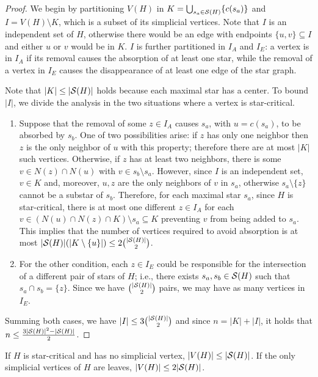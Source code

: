 \begin{proof}
    We begin by partitioning $V(H)$ in $K = \bigcup_{s_a \in \mathcal{S}(H)} \{c(s_a)\}$ and $I = V(H) \setminus K$, which is a subset of its simplicial vertices.
    Note that $I$ is an independent set of $H$, otherwise there would be an edge with endpoints $\{u,v\} \subseteq I$ and either $u$ or $v$ would be in $K$.
    $I$ is further partitioned in $I_A$ and $I_E$: a vertex is in $I_A$ if its removal causes the absorption of at least one star, while the removal of a vertex in $I_E$ causes the disappearance of at least one edge of the star graph.
    
    Note that $|K| \leq |\mathcal{S}(H)|$ holds because each maximal star has a center.
    To bound $|I|$, we divide the analysis in the two situations where a vertex is star-critical.
    \begin{enumerate}
        \item Suppose that the removal of some $z \in I_A$ causes $s_a$, with $u = c(s_a)$, to be absorbed by $s_b$.
        One of two possibilities arise: if $z$ has only one neighbor then $z$ is the only neighbor of $u$ with this property; therefore there are at most $|K|$ such vertices.
        Otherwise, if $z$ has at least two neighbors, there is some $v \in N(z) \cap N(u)$ with $v \in s_b \setminus s_a$. However, since $I$ is an independent set, $v \in K$ and, moreover, $u,z$ are the only neighbors of $v$ in $s_a$, otherwise $s_a \setminus \{z\}$ cannot be a substar of $s_b$. Therefore, for each maximal star $s_a$, since $H$ is star-critical, there is at most one different $z \in I_A$ for each $v \in (N(u) \cap N(z) \cap K) \setminus s_a \subseteq K$ preventing $v$ from being added to $s_a$.
        This implies that the number of vertices required to avoid absorption is at most $|\mathcal{S}(H)|(|K \setminus \{u\}|) \leq 2\binom{|\mathcal{S}(H)|}{2}$.
        \item For the other condition, each $z \in I_E$ could be responsible for the intersection of a different pair of stars of $H$; i.e., there exists $s_a,s_b \in \mathcal{S}(H)$ such that $s_a \cap s_b = \{z\}$.
        Since we have $\binom{|\mathcal{S}(H)|}{2}$ pairs, we may have as many vertices in $I_E$.
    \end{enumerate}
    Summing both cases, we have $|I| \leq 3\binom{|\mathcal{S}(H)|}{2}$ and since $n = |K| + |I|$, it holds that $n \leq \frac{3|\mathcal{S}(H)|^2 - |\mathcal{S}(H)|}{2}$.
\end{proof}

\begin{corollary}
    If $H$ is star-critical and has no simplicial vertex, $|V(H)| \leq |\mathcal{S}(H)|$.
    If the only simplicial vertices of $H$ are leaves, $|V(H)| \leq 2|\mathcal{S}(H)|$.
\end{corollary}

